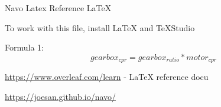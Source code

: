 \documentclass{article}
\begin{document}
Navo Latex Reference \LaTeX

To work with this file, install LaTeX and TeXStudio

Formula 1:
\[ gearbox_{cpr} = gearbox_{ratio} * motor_{cpr} \]

\url{https://www.overleaf.com/learn} - LaTeX reference docu

\url{https://joesan.github.io/navo/}
\end{document}
